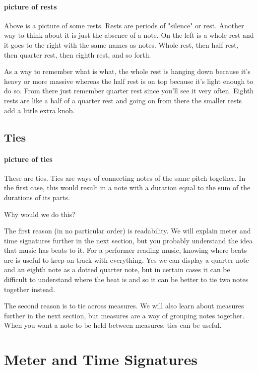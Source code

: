 \documentclass[../OpenAppliedMusicTheory.tex]{subfiles}
\begin{document}
        \paragraph{picture of rests} Above is a picture of some rests. Rests are periods of "silence" or rest. Another way to think about it is just the absence of a note. On the left is a whole rest and it goes to the right with the same names as notes. Whole rest, then half rest, then quarter rest, then eighth rest, and so forth. 

        As a way to remember what is what, the whole rest is hanging down because it's heavy or more massive whereas the half rest is on top because it's light enough to do so. From there just remember quarter rest since you'll see it very often. Eighth rests are like a half of a quarter rest and going on from there the smaller rests add a little extra knob. %

        \subsection{Ties}
        \paragraph{picture of ties} These are ties. Ties are ways of connecting notes of the same pitch together. In the first case, this would result in a note with a duration equal to the sum of the durations of its parts. 

        Why would we do this?

        The first reason (in no particular order) is readability. We will explain meter and time signatures further in the next section, but you probably understand the idea that music has beats to it. For a performer reading music, knowing where beats are is useful to keep on track with everything. Yes we can display a quarter note and an eighth note as a dotted quarter note, but in certain cases it can be difficult to understand where the beat is and so it can be better to tie two notes together instead.

        The second reason is to tie across measures. We will also learn about measures further in the next section, but measures are a way of grouping notes together. When you want a note to be held between measures, ties can be useful.
    
    \section{Meter and Time Signatures}\label{ch2:meter}
\end{document}
